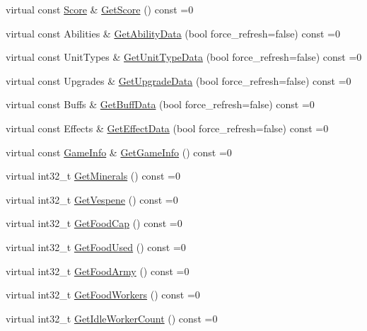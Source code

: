 \begin{DoxyCompactItemize}
virtual const \hyperlink{structsc2_1_1_score}{Score} \& \hyperlink{classsc2_1_1_observation_interface_a3ced6a72078288c373ad04c72eb1fba7}{Get\+Score} () const =0
\item 
virtual const Abilities \& \hyperlink{classsc2_1_1_observation_interface_a99e1d892c350e4ae10c615bf3185eb85}{Get\+Ability\+Data} (bool force\+\_\+refresh=false) const =0
\item 
virtual const Unit\+Types \& \hyperlink{classsc2_1_1_observation_interface_ae80acee23f67a2b5f67fa511dd158aca}{Get\+Unit\+Type\+Data} (bool force\+\_\+refresh=false) const =0
\item 
virtual const Upgrades \& \hyperlink{classsc2_1_1_observation_interface_a10b0d3b3131951ad656cb091aaa2040d}{Get\+Upgrade\+Data} (bool force\+\_\+refresh=false) const =0
\item 
virtual const Buffs \& \hyperlink{classsc2_1_1_observation_interface_a1b891d52ce1fe82dac0288797ad3720a}{Get\+Buff\+Data} (bool force\+\_\+refresh=false) const =0
\item 
virtual const Effects \& \hyperlink{classsc2_1_1_observation_interface_a2b3bae3c5a9e88f1164a11eba12c037f}{Get\+Effect\+Data} (bool force\+\_\+refresh=false) const =0
\item 
virtual const \hyperlink{structsc2_1_1_game_info}{Game\+Info} \& \hyperlink{classsc2_1_1_observation_interface_a7b73eb640b052409b0095609a8136102}{Get\+Game\+Info} () const =0
\item 
virtual int32\+\_\+t \hyperlink{classsc2_1_1_observation_interface_a107f76b56a961407bb772d91dfbbb040}{Get\+Minerals} () const =0
\item 
virtual int32\+\_\+t \hyperlink{classsc2_1_1_observation_interface_aa31de2f1b14a2306a282fef7314fbf37}{Get\+Vespene} () const =0
\item 
virtual int32\+\_\+t \hyperlink{classsc2_1_1_observation_interface_ac556f665e6920eb853711c1b7d4d54b3}{Get\+Food\+Cap} () const =0
\item 
virtual int32\+\_\+t \hyperlink{classsc2_1_1_observation_interface_a77f230bd98b95599338c7788aee00d26}{Get\+Food\+Used} () const =0
\item 
virtual int32\+\_\+t \hyperlink{classsc2_1_1_observation_interface_a7fd13a2a776f08f714d941ba9e4bafa8}{Get\+Food\+Army} () const =0
\item 
virtual int32\+\_\+t \hyperlink{classsc2_1_1_observation_interface_a19f0bdd8df647ee935dbe6f3c50d64e7}{Get\+Food\+Workers} () const =0
\item 
virtual int32\+\_\+t \hyperlink{classsc2_1_1_observation_interface_aa02a57eddba0fca44df116439979f8b7}{Get\+Idle\+Worker\+Count} () const =0

\end{DoxyCompactItemize}
